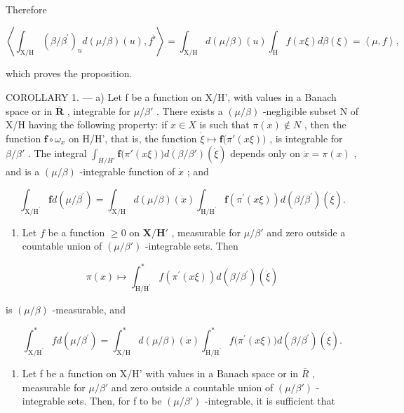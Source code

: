 Therefore

\[
\left\langle \int_ {\mathrm{X/H}} (\beta / \beta^ {\prime}) _ {u} d (\mu / \beta) (u), f ^ {\flat} \right\rangle = \int_ {\mathrm{X/H}} d (\mu / \beta) (u) \int_ {\mathrm{H}} f (x \xi) d \beta (\xi) = \left\langle \mu , f \right\rangle ,
\]

which proves the proposition.

COROLLARY 1. --- a) Let f be a function on X/H', with values in a Banach space or in \(\overline{\mathbf{R}}\) , integrable for \(\mu/\beta'\) . There exists a \((\mu/\beta)\) -negligible subset N of X/H having the following property: if \(x \in X\) is such that \(\pi(x) \notin N\) , then the function \(\mathbf{f} \circ \omega_x\) on H/H', that is, the function \(\dot{\xi} \mapsto \mathbf{f}\big(\pi'(x\xi)\big)\) , is integrable for \(\beta/\beta'\) . The integral \(\int_{H/H'} \mathbf{f}\big(\pi'(x\xi)\big)d(\beta/\beta')(\dot{\xi})\) depends only on \(\dot{x} = \pi(x)\) , and is a \((\mu/\beta)\) -integrable function of \(\dot{x}\) ; and

\[
\int_ {\mathrm{X} / \mathrm{H} ^ {\prime}} \mathbf {f} d (\mu / \beta^ {\prime}) = \int_ {\mathrm{X} / \mathrm{H}} d (\mu / \beta) (\dot {x}) \int_ {\mathrm{H} / \mathrm{H} ^ {\prime}} \mathbf {f} \left(\pi^ {\prime} (x \xi)\right) d (\beta / \beta^ {\prime}) (\dot {\xi}).
\]

\begin{enumerate}
\def\labelenumi{\alph{enumi})}
\setcounter{enumi}{1}
\tightlist
\item
  Let \(f\) be a function \(\geqslant 0\) on \(\mathbf{X} / \mathbf{H}'\) , measurable for \(\mu / \beta'\) and zero outside a countable union of \((\mu / \beta')\) -integrable sets. Then
\end{enumerate}

\[
\pi (x) \mapsto \int_ {\mathrm{H} / \mathrm{H} ^ {\prime}} ^ {*} f (\pi^ {\prime} (x \xi)) d (\beta / \beta^ {\prime}) (\dot {\xi})
\]

is \((\mu /\beta)\) -measurable, and

\[
\int_ {\mathrm {X/ H^ {\prime}}} ^ {*} f d (\mu / \beta^ {\prime}) = \int_ {\mathrm{X/H}} ^ {*} d (\mu / \beta) (\dot {x}) \int_ {\mathrm {H/ H^ {\prime}}} ^ {*} f \bigl (\pi^ {\prime} (x \xi) \bigr) d (\beta / \beta^ {\prime}) (\dot {\xi}).
\]

\begin{enumerate}
\def\labelenumi{\alph{enumi})}
\setcounter{enumi}{2}
\tightlist
\item
  Let f be a function on X/H' with values in a Banach space or in \(\overline{R}\) , measurable for \(\mu/\beta'\) and zero outside a countable union of \((\mu/\beta')\) -integrable sets. Then, for f to be \((\mu/\beta')\) -integrable, it is sufficient that
\end{enumerate}

